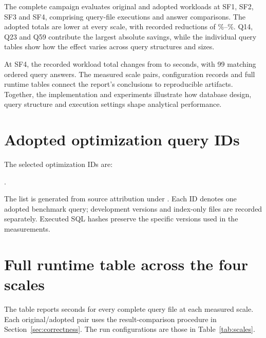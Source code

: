 \documentclass[11pt,a4paper]{article}
\DeclareRobustCommand{\file}[1]{\path{#1}}
\begin{document}
The complete campaign evaluates original and adopted workloads at SF1, SF2,
SF3 and SF4, comprising \TotalQueryExecutions{} query-file executions and
\TotalAnswerComparisons{} answer comparisons. The adopted totals are lower
at every scale, with recorded reductions of \MinRuntimeReduction\%--\MaxRuntimeReduction\%.
Q14, Q23 and Q59 contribute the largest absolute savings, while the individual
query tables show how the effect varies across query structures and sizes.

At SF4, the recorded workload total changes from \SFfourOriginalSeconds{} to
\SFfourAdoptedSeconds{} seconds, with 99 matching ordered query answers. The
measured scale pairs, configuration records and full runtime tables connect
the report's conclusions to reproducible artifacts. Together, the implementation
and experiments illustrate how database design, query structure and execution
settings shape analytical performance.

\clearpage


\clearpage
\appendix
\section{Adopted optimization query IDs}
\label{app:ids}
The \AdoptedCount{} selected optimization IDs are:

\OptimizedQueryIDs.

The list is generated from source attribution under \file{queries/tuned/}.
Each ID denotes one adopted benchmark query; development versions and
index-only files are recorded separately. Executed SQL hashes preserve the
specific versions used in the measurements.

\section{Full runtime table across the four scales}
\label{app:queries}
The table reports seconds for every complete query file at each measured
scale. Each original/adopted pair uses the result-comparison procedure in
Section~\ref{sec:correctness}. The run configurations are those in
Table~\ref{tab:scales}.

{\footnotesize}
\end{document}
